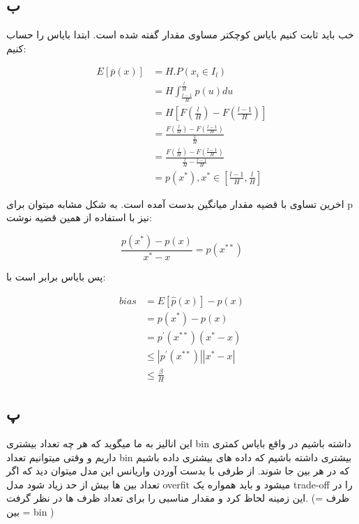 \documentclass{article}[12pt]
\begin{document}
\subsection{ب}

خب باید ثابت کنیم بایاس کوچکتر مساوی مقدار گفته شده است. ابتدا بایاس را حساب کنیم:

\begin{equation*}
\begin{split}
 E[\bar{p}(x)] &=
H . P(x_i \in I_l) \\
&= H \int_{\frac{l-1}{H}}^{\frac{l}{H}}  p(u)du \\
&= H [F(\frac{l}{H}) - F(\frac{l-1}{H})] \\
&=  \frac{F(\frac{l}{H}) - F(\frac{l-1}{H})}{\frac{1}{H}}
\\
&= \frac{F(\frac{l}{H}) - F(\frac{l-1}{H})}
{\frac{l}{H}-\frac{l-1}{H}}
\\
&= p(x^*), x^* \in [\frac{l-1}{H},\frac{l}{H}]
\end{split}
\end{equation*}

اخرین تساوی با قضیه مقدار میانگین بدست آمده است. به شکل مشابه میتوان برای p نیز با استفاده از همین قضیه نوشت:

\begin{equation*}
\frac{p(x^*)-p(x)}{x^*-x} = p(x^{**})
\end{equation*}

پس بایاس برابر است با: 

\begin{equation*}
\begin{split}
bias &=E[\hat{p}(x)]  - p(x)  \\
&= p(x^*) - p(x) \\&= 
p^\prime (x^{**}) (x^*- x)
\\&\leq |p^\prime (x^{**})| |x^*- x|
\\&\leq \frac{\beta}{H}
\end{split}
\end{equation*}
\subsection{پ}

این انالیز به ما میگوید که هر چه تعداد بیشتری bin داشته باشیم در واقع بایاس کمتری داریم و وقتی میتوانیم تعداد bin بیشتری داشته باشیم که داده های بیشتری داده باشیم که در هر بین جا شوند. از طرفی با بدست آوردن واریانس این مدل میتوان دید که اگر تعداد بین ها بیش از حد زیاد شود مدل overfit میشود و باید همواره یک trade-off را در این زمینه لحاظ کرد و مقدار مناسبی را برای تعداد ظرف ها در نظر گرفت. (ظرف = بین = bin
)
\end{document}
